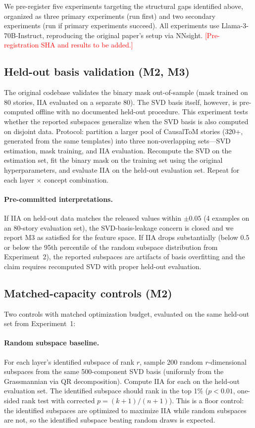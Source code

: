 \documentclass[11pt]{article}
\begin{document}
We pre-register five experiments targeting the structural gaps identified above, organized as three primary experiments (run first) and two secondary experiments (run if primary experiments succeed). All experiments use Llama-3-70B-Instruct, reproducing the original paper's setup via NNsight. \textcolor{red}{[Pre-registration SHA and results to be added.]}

\subsection{Held-out basis validation (M2, M3)}

The original codebase validates the binary mask out-of-sample (mask trained on 80 stories, IIA evaluated on a separate 80). The SVD basis itself, however, is pre-computed offline with no documented held-out procedure. This experiment tests whether the reported subspaces generalize when the SVD basis is also computed on disjoint data. Protocol: partition a larger pool of CausalToM stories (320+, generated from the same templates) into three non-overlapping sets---SVD estimation, mask training, and IIA evaluation. Recompute the SVD on the estimation set, fit the binary mask on the training set using the original hyperparameters, and evaluate IIA on the held-out evaluation set. Repeat for each layer $\times$ concept combination.

\paragraph{Pre-committed interpretations.} If IIA on held-out data matches the released values within $\pm 0.05$ (4 examples on an 80-story evaluation set), the SVD-basis-leakage concern is closed and we report M3 as satisfied for the feature space. If IIA drops substantially (below 0.5 or below the 95th percentile of the random subspace distribution from Experiment~2), the reported subspaces are artifacts of basis overfitting and the claim requires recomputed SVD with proper held-out evaluation.

\subsection{Matched-capacity controls (M2)}

Two controls with matched optimization budget, evaluated on the same held-out set from Experiment~1:

\paragraph{Random subspace baseline.} For each layer's identified subspace of rank $r$, sample 200 random $r$-dimensional subspaces from the same 500-component SVD basis (uniformly from the Grassmannian via QR decomposition). Compute IIA for each on the held-out evaluation set. The identified subspace should rank in the top 1\% ($p < 0.01$, one-sided rank test with corrected $p = (k + 1)/(n + 1)$). This is a floor control: the identified subspaces are optimized to maximize IIA while random subspaces are not, so the identified subspace beating random draws is expected.
\end{document}
